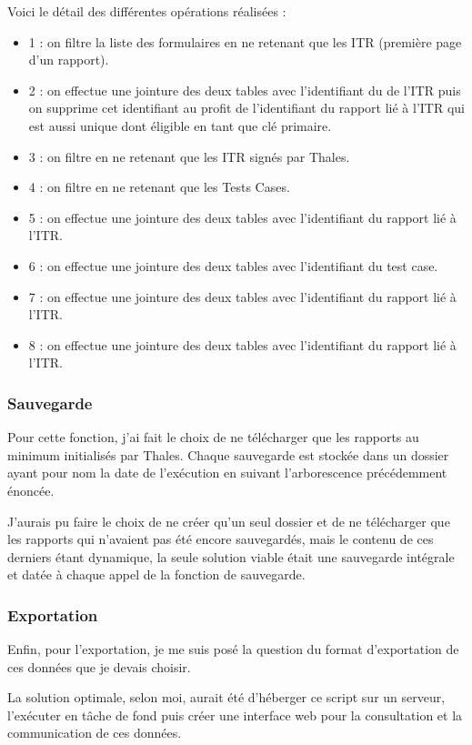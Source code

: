 Voici le détail des différentes opérations réalisées :
\begin{itemize}
\item 1 : on filtre la liste des formulaires en ne retenant que les ITR (première page d'un rapport).
\item 2 : on effectue une jointure des deux tables avec l'identifiant du de l'ITR puis on supprime cet identifiant au profit de l'identifiant du rapport lié à l'ITR qui est aussi unique dont éligible en tant que clé primaire.
\item 3 : on filtre en ne retenant que les ITR signés par Thales.
\item 4 : on filtre en ne retenant que les Tests Cases.
\item 5 : on effectue une jointure des deux tables avec l'identifiant du rapport lié à l'ITR.
\item 6 : on effectue une jointure des deux tables avec l'identifiant du test case.
\item 7 : on effectue une jointure des deux tables avec l'identifiant du rapport lié à l'ITR.
\item 8 : on effectue une jointure des deux tables avec l'identifiant du rapport lié à l'ITR.
\end{itemize}

\subsubsection{Sauvegarde}
Pour cette fonction, j'ai fait le choix de ne télécharger que les rapports au minimum initialisés par Thales. Chaque sauvegarde est stockée dans un dossier ayant pour nom la date de l'exécution en suivant l'arborescence précédemment énoncée.

J'aurais pu faire le choix de ne créer qu'un seul dossier et de ne télécharger que les rapports qui n'avaient pas été encore sauvegardés,
mais le contenu de ces derniers étant dynamique, la seule solution viable était une sauvegarde intégrale et datée à chaque appel de la fonction de sauvegarde.

\newpage
\subsubsection{Exportation}
Enfin, pour l'exportation, je me suis posé la question du format d'exportation de ces données que je devais choisir.

La solution optimale, selon moi, aurait été d'héberger ce script sur un serveur, l'exécuter en tâche de fond puis créer une interface web pour la consultation et la communication de ces données.

